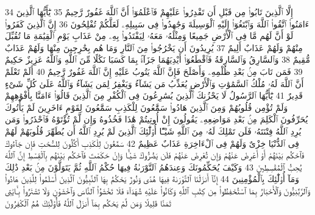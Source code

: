 {\tiny\colorbox{cl_aya}{34}} إِلَّا ٱلَّذِينَ تَابُوا۟ مِن قَبْلِ أَن تَقْدِرُوا۟ عَلَيْهِمْ فَٱعْلَمُوٓا۟ أَنَّ ٱللَّهَ غَفُورٌ رَّحِيمٌ
{\tiny\colorbox{cl_aya}{35}} يَٰٓأَيُّهَا ٱلَّذِينَ ءَامَنُوا۟ ٱتَّقُوا۟ ٱللَّهَ وَٱبْتَغُوٓا۟ إِلَيْهِ ٱلْوَسِيلَةَ وَجَٰهِدُوا۟ فِى سَبِيلِهِۦ لَعَلَّكُمْ تُفْلِحُونَ
{\tiny\colorbox{cl_aya}{36}} إِنَّ ٱلَّذِينَ كَفَرُوا۟ لَوْ أَنَّ لَهُم مَّا فِى ٱلْأَرْضِ جَمِيعًا وَمِثْلَهُۥ مَعَهُۥ لِيَفْتَدُوا۟ بِهِۦ مِنْ عَذَابِ يَوْمِ ٱلْقِيَٰمَةِ مَا تُقُبِّلَ مِنْهُمْ وَلَهُمْ عَذَابٌ أَلِيمٌ
{\tiny\colorbox{cl_aya}{37}} يُرِيدُونَ أَن يَخْرُجُوا۟ مِنَ ٱلنَّارِ وَمَا هُم بِخَٰرِجِينَ مِنْهَا وَلَهُمْ عَذَابٌ مُّقِيمٌ
{\tiny\colorbox{cl_aya}{38}} وَٱلسَّارِقُ وَٱلسَّارِقَةُ فَٱقْطَعُوٓا۟ أَيْدِيَهُمَا جَزَآءًۢ بِمَا كَسَبَا نَكَٰلًا مِّنَ ٱللَّهِ وَٱللَّهُ عَزِيزٌ حَكِيمٌ
{\tiny\colorbox{cl_aya}{39}} فَمَن تَابَ مِنۢ بَعْدِ ظُلْمِهِۦ وَأَصْلَحَ فَإِنَّ ٱللَّهَ يَتُوبُ عَلَيْهِ إِنَّ ٱللَّهَ غَفُورٌ رَّحِيمٌ
{\tiny\colorbox{cl_aya}{40}} أَلَمْ تَعْلَمْ أَنَّ ٱللَّهَ لَهُۥ مُلْكُ ٱلسَّمَٰوَٰتِ وَٱلْأَرْضِ يُعَذِّبُ مَن يَشَآءُ وَيَغْفِرُ لِمَن يَشَآءُ وَٱللَّهُ عَلَىٰ كُلِّ شَىْءٍ قَدِيرٌ
{\tiny\colorbox{cl_aya}{41}} يَٰٓأَيُّهَا ٱلرَّسُولُ لَا يَحْزُنكَ ٱلَّذِينَ يُسَٰرِعُونَ فِى ٱلْكُفْرِ مِنَ ٱلَّذِينَ قَالُوٓا۟ ءَامَنَّا بِأَفْوَٰهِهِمْ وَلَمْ تُؤْمِن قُلُوبُهُمْ وَمِنَ ٱلَّذِينَ هَادُوا۟ سَمَّٰعُونَ لِلْكَذِبِ سَمَّٰعُونَ لِقَوْمٍ ءَاخَرِينَ لَمْ يَأْتُوكَ يُحَرِّفُونَ ٱلْكَلِمَ مِنۢ بَعْدِ مَوَاضِعِهِۦ يَقُولُونَ إِنْ أُوتِيتُمْ هَٰذَا فَخُذُوهُ وَإِن لَّمْ تُؤْتَوْهُ فَٱحْذَرُوا۟ وَمَن يُرِدِ ٱللَّهُ فِتْنَتَهُۥ فَلَن تَمْلِكَ لَهُۥ مِنَ ٱللَّهِ شَيْـًٔا أُو۟لَٰٓئِكَ ٱلَّذِينَ لَمْ يُرِدِ ٱللَّهُ أَن يُطَهِّرَ قُلُوبَهُمْ لَهُمْ فِى ٱلدُّنْيَا خِزْىٌ وَلَهُمْ فِى ٱلْءَاخِرَةِ عَذَابٌ عَظِيمٌ
{\tiny\colorbox{cl_aya}{42}} سَمَّٰعُونَ لِلْكَذِبِ أَكَّٰلُونَ لِلسُّحْتِ فَإِن جَآءُوكَ فَٱحْكُم بَيْنَهُمْ أَوْ أَعْرِضْ عَنْهُمْ وَإِن تُعْرِضْ عَنْهُمْ فَلَن يَضُرُّوكَ شَيْـًٔا وَإِنْ حَكَمْتَ فَٱحْكُم بَيْنَهُم بِٱلْقِسْطِ إِنَّ ٱللَّهَ يُحِبُّ ٱلْمُقْسِطِينَ
{\tiny\colorbox{cl_aya}{43}} وَكَيْفَ يُحَكِّمُونَكَ وَعِندَهُمُ ٱلتَّوْرَىٰةُ فِيهَا حُكْمُ ٱللَّهِ ثُمَّ يَتَوَلَّوْنَ مِنۢ بَعْدِ ذَٰلِكَ وَمَآ أُو۟لَٰٓئِكَ بِٱلْمُؤْمِنِينَ
{\tiny\colorbox{cl_aya}{44}} إِنَّآ أَنزَلْنَا ٱلتَّوْرَىٰةَ فِيهَا هُدًى وَنُورٌ يَحْكُمُ بِهَا ٱلنَّبِيُّونَ ٱلَّذِينَ أَسْلَمُوا۟ لِلَّذِينَ هَادُوا۟ وَٱلرَّبَّٰنِيُّونَ وَٱلْأَحْبَارُ بِمَا ٱسْتُحْفِظُوا۟ مِن كِتَٰبِ ٱللَّهِ وَكَانُوا۟ عَلَيْهِ شُهَدَآءَ فَلَا تَخْشَوُا۟ ٱلنَّاسَ وَٱخْشَوْنِ وَلَا تَشْتَرُوا۟ بِـَٔايَٰتِى ثَمَنًا قَلِيلًا وَمَن لَّمْ يَحْكُم بِمَآ أَنزَلَ ٱللَّهُ فَأُو۟لَٰٓئِكَ هُمُ ٱلْكَٰفِرُونَ
